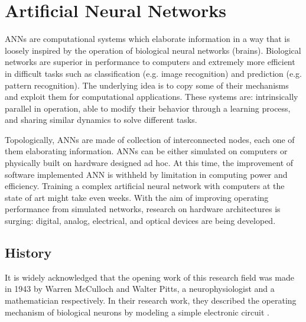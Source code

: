 \chapter{Artificial Neural Networks}
\label{ch:Artificial_Neural_Networks}

\acfp{ANN} are computational systems which elaborate information in a way that is loosely inspired by the operation of biological neural networks (brains).
Biological networks are superior in performance to computers and extremely more efficient in difficult tasks such as classification (e.g. image recognition) and prediction (e.g. pattern recognition).
The underlying idea is to copy some of their mechanisms and exploit them for computational applications.
These systems are: intrinsically parallel in operation, able to modify their behavior through a learning process, and sharing similar dynamics to solve different tasks.

Topologically, \acsp{ANN} are made of collection of interconnected nodes, each one of them elaborating information.
\acsp{ANN} can be either simulated on computers or physically built on hardware designed ad hoc.
At this time, the improvement of software implemented ANN is withheld by limitation in computing power and efficiency.
Training a complex artificial neural network with computers at the state of art might take even weeks.
With the aim of improving operating performance from simulated networks, research on hardware architectures is surging: digital, analog, electrical, and optical devices are being developed.

\section{History}
\label{sec:History}
It is widely acknowledged that the opening work of this research field was made in 1943 by Warren McCulloch and Walter Pitts, a neurophysiologist and a mathematician respectively.
In their research work, they described the operating mechanism of biological neurons by modeling a simple electronic circuit \cite{McCulloch1943}.

